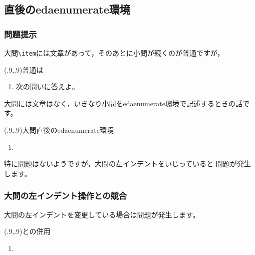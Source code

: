 \documentclass[fleqn,a4j]{jarticle}
\begin{document}
\subsection{直後のedaenumerate環境}
\subsubsection{問題提示}
大問\verb+\item+には文章があって，そのあとに小問が続くのが普通ですが，

\begin{showEx}(.9,.9){普通は}
\begin{enumerate}[\protect\expandafter\fbox 1]
  \item 次の問いに答えよ。
\end{enumerate}
\end{showEx}

大問には文章はなく，いきなり小問をedaenumerate環境で記述するときの話です。

\begin{showEx}(.9,.9){大問直後のedaenumerate環境}
\begin{enumerate}[\protect\expandafter\fbox 1]
  \item
\end{enumerate}
\end{showEx}

特に問題はないようですが，大問の左インデントをいじっていると
問題が発生します。

\subsubsection{大問の左インデント操作との競合}
大問の左インデントを変更している場合は問題が発生します。

\begin{showEx}(.9,.9){との併用}
\enumLmargini{0pt}
\begin{enumerate}[\protect\expandafter\fbox 1]
  \item
\end{enumerate}
\end{showEx}
\end{document}
